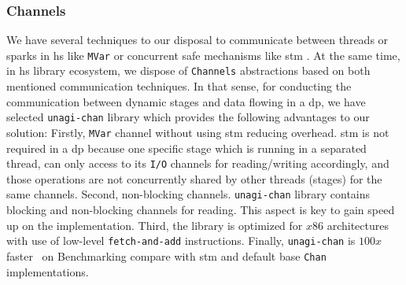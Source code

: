 \subsubsection{Channels\label{section:channels}} 
We have several techniques to our disposal to communicate between threads or sparks in \acrshort{hs} like \texttt{MVar} or concurrent safe mechanisms like \acrfull{stm} \cite{stm}. 
At the same time, in \acrshort{hs} library ecosystem, we dispose of \texttt{Channels} abstractions based on both mentioned communication techniques. 
In that sense, for conducting the communication between dynamic stages and data flowing in a \acrshort{dp}, we have selected \texttt{unagi-chan} library \cite{unagi} which provides the following advantages to our solution: Firstly, \texttt{MVar} channel without using \acrshort{stm} reducing overhead. 
\acrshort{stm} is not required in a \acrshort{dp} because one specific stage which is running in a separated thread, can only access to its \texttt{I/O} channels for reading/writing accordingly, and those operations are not concurrently shared by other threads (stages) for the same channels. 
Second, non-blocking channels. \texttt{unagi-chan} library contains blocking and non-blocking channels for reading. This aspect is key to gain speed up on the implementation. Third, the library is optimized for $x86$ architectures with use of low-level \texttt{fetch-and-add} instructions. Finally, \texttt{unagi-chan} is $100x$ faster~\cite{unagi-bench} on Benchmarking compare with \acrshort{stm} and default base \texttt{Chan} implementations.


